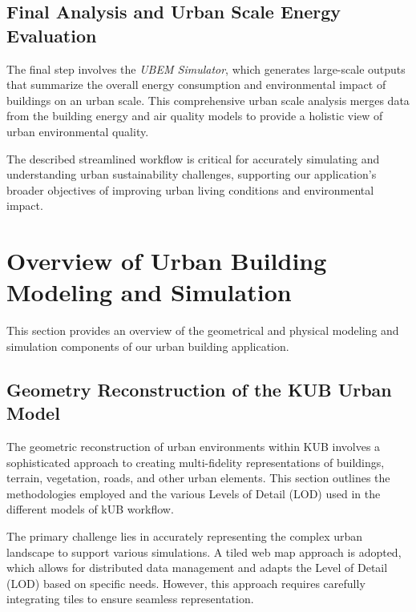 \documentclass[runningheads]{llncs}
\begin{document}
\subsection{Final Analysis and Urban Scale Energy Evaluation}
\label{sec:final-analysis}

The final step involves the \textit{UBEM Simulator}, which generates large-scale outputs that summarize the overall energy consumption and environmental impact of buildings on an urban scale. This comprehensive urban scale analysis merges data from the building energy and air quality models to provide a holistic view of urban environmental quality.

The described streamlined workflow is critical for accurately simulating and understanding urban sustainability challenges, supporting our application's broader objectives of improving urban living conditions and environmental impact.


\section{Overview of Urban Building Modeling and Simulation}
\label{sec:urban-building}

This section provides an overview of the geometrical and physical modeling and simulation components of our urban building application.

\subsection{Geometry Reconstruction of the KUB Urban Model}

The geometric reconstruction of urban environments within KUB involves a sophisticated approach to creating multi-fidelity representations of buildings, terrain, vegetation, roads, and other urban elements. This section outlines the methodologies employed and the various Levels of Detail (LOD) used in the different models of kUB workflow.


The primary challenge lies in accurately representing the complex urban landscape to support various simulations. A tiled web map approach is adopted, which allows for distributed data management and adapts the Level of Detail (LOD) based on specific needs. However, this approach requires carefully integrating tiles to ensure seamless representation.
\end{document}
